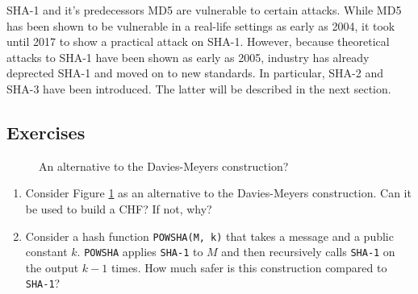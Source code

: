 SHA-1 and it's predecessors MD5 are vulnerable to certain attacks.
While MD5 has been shown to be vulnerable in a real-life settings as early as 2004, it took until 2017 to show a practical attack on SHA-1.
However, because theoretical attacks to SHA-1 have been shown as early as 2005, industry has already deprected SHA-1 and moved on to new standards.
In particular, SHA-2 and SHA-3 have been introduced. The latter will be described in the next section.




\subsection*{Exercises}
\begin{figure}[htb]
    \caption{An alternative to the Davies-Meyers construction?}
    \label{fig:dm-alt-construction}
\end{figure}

\begin{enumerate}[label=\textbf{Exercise \thesection.\arabic*}, wide=0pt]
    \item Consider Figure \ref{fig:dm-alt-construction} as an alternative to the Davies-Meyers construction. Can it be used to build a CHF? If not, why?
    \item Consider a hash function \texttt{POWSHA(M, k)} that takes a message and a public constant $k$. \texttt{POWSHA} applies \texttt{SHA-1} to $M$ and then recursively calls \texttt{SHA-1} on the output $k-1$ times. How much safer is this construction compared to \texttt{SHA-1}?
\end{enumerate}



